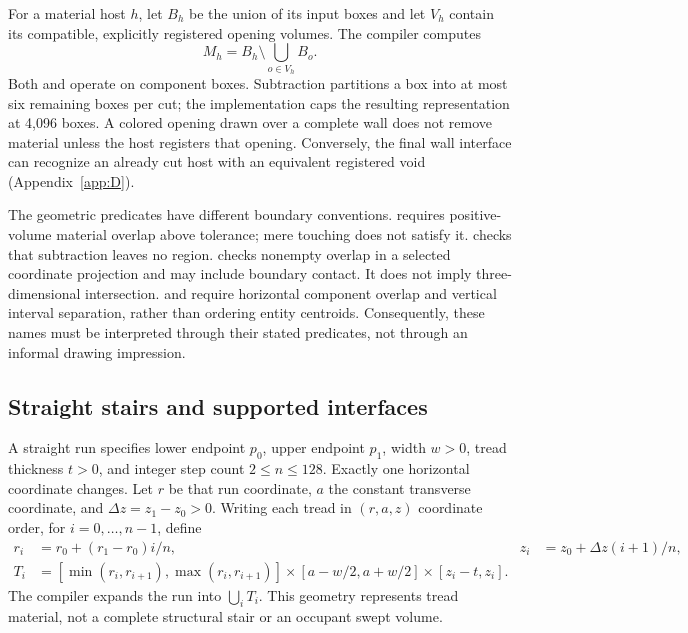 For a material host $h$, let $B_h$ be the union of its input boxes and let $V_h$ contain its compatible, explicitly registered opening volumes. The compiler computes
\begin{equation}
M_h=B_h\setminus\bigcup_{o\in V_h}B_o.
\label{eq:material-difference}
\end{equation}
Both  and  operate on component boxes. Subtraction partitions a box into at most six remaining boxes per cut; the implementation caps the resulting representation at 4,096 boxes. A colored opening drawn over a complete wall does not remove material unless the host registers that opening. Conversely, the final wall interface can recognize an already cut host with an equivalent registered void (Appendix~\ref{app:D}).

The geometric predicates have different boundary conventions.  requires positive-volume material overlap above tolerance; mere touching does not satisfy it.  checks that subtraction leaves no region.  checks nonempty overlap in a selected coordinate projection and may include boundary contact. It does not imply three-dimensional intersection.  and  require horizontal component overlap and vertical interval separation, rather than ordering entity centroids. Consequently, these names must be interpreted through their stated predicates, not through an informal drawing impression.

\subsection{Straight stairs and supported interfaces}
A straight run specifies lower endpoint $p_0$, upper endpoint $p_1$, width $w>0$, tread thickness $t>0$, and integer step count $2\le n\le128$. Exactly one horizontal coordinate changes. Let $r$ be that run coordinate, $a$ the constant transverse coordinate, and $\Delta z=z_1-z_0>0$. Writing each tread in $(r,a,z)$ coordinate order, for $i=0,\ldots,n-1$, define
\begin{align}
r_i&=r_0+(r_1-r_0)i/n,& z_i&=z_0+\Delta z(i+1)/n,\\
T_i&=[\min(r_i,r_{i+1}),\max(r_i,r_{i+1})]
\times[a-w/2,a+w/2]\times[z_i-t,z_i].
\end{align}
The compiler expands the run into $\bigcup_iT_i$. This geometry represents tread material, not a complete structural stair or an occupant swept volume.

